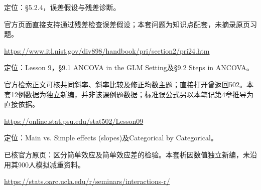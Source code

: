 \par\noindent\begin{minipage}{\linewidth}\label{src:NIST_RESID}
\par
定位：§5.2.4，误差假设与残差诊断。\par
官方页面直接支持通过残差检查误差假设；本套问题为知识点配套，未摘录原页习题。\par
{\small\url{https://www.itl.nist.gov/div898/handbook/pri/section2/pri24.htm}}\par
\end{minipage}\par\medskip

\par\noindent\begin{minipage}{\linewidth}\label{src:PSU_ANCOVA}
\par
定位：Lesson 9，§9.1 ANCOVA in the GLM Setting及§9.2 Steps in ANCOVA。\par
官方检索正文可核共同斜率、斜率比较及修正均数主题；直接打开曾返回502。本套12例数据为独立新编，并非该课例题数据；标准误公式另以本笔记第4章推导为直接依据。\par
{\small\url{https://online.stat.psu.edu/stat502/Lesson09}}\par
\end{minipage}\par\medskip

\par\noindent\begin{minipage}{\linewidth}\label{src:UCLA_INTER}
\par
定位：Main vs. Simple effects (slopes)及Categorical by Categorical。\par
已核官方原页：区分简单效应及简单效应差的检验。本套析因数值独立新编，未沿用其900人模拟减重资料。\par
{\small\url{https://stats.oarc.ucla.edu/r/seminars/interactions-r/}}\par
\end{minipage}\par\medskip

